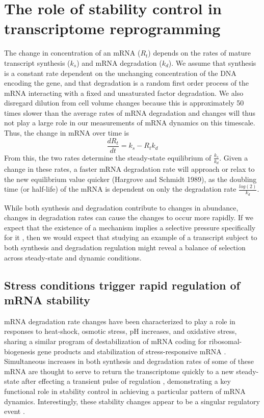 \section{The role of stability control in transcriptome
reprogramming}

The change in concentration of an mRNA ($R_t$) depends
on the rates of mature transcript synthesis ($k_s$) and mRNA
degradation ($k_d$). We assume that
synthesis is a constant rate dependent on the unchanging concentration
of the DNA encoding the gene, and that degradation is a random first
order process of the mRNA interacting with a fixed and unsaturated
factor degradation. We also disregard dilution from cell volume
changes because this is approximately 50 times slower than the average
rates of mRNA degradation and changes will thus not play a large role
in our measurements of mRNA dynamics on this timescale.  
Thus, the change in mRNA over time is $$
\frac{dR_t}{dt} = k_s - R_t k_d$$ From this, the two rates determine
the steady-state equilibrium of $\frac{k_s}{k_d}$. Given a change in
these rates, a faster mRNA degradation rate will approach or relax to
the new equilibrium value quicker (Hargrove and Schmidt 1989), as the
doubling time (or half-life) of the mRNA is dependent on only the
degradation rate $\frac{log(2)}{k_d}$.  

While both synthesis and
degradation contribute to changes in abundance, changes in degradation
rates can cause the changes to occur more rapidly. If we expect that
the existence of a mechanism implies a selective pressure specifically
for it 
\parencite{gould1979spandrels},
then we would expect that studying
an example of a transcript subject to both synthesis and degradation
regulation might reveal a balance of selection across steady-state and
dynamic conditions. 

\subsection{Stress conditions trigger rapid regulation of mRNA stability}

mRNA degradation rate changes have been characterized
to play a role in responses to heat-shock, osmotic stress, pH
increases, and oxidative stress, sharing a similar program of
destabilization of mRNA coding for ribosomal-biogenesis gene products
and stabilization of stress-responsive mRNA 
\parencite{canadell2015impact,molina2008comprehensive,shalem2011transcriptome,romero2009specific,molin2009mrna,castells2011heat,miller2011dynamic,garre2013nonsense}.
Simultaneous increases in both synthesis and
degradation rates of some of these mRNA are thought to serve to return
the transcriptome quickly to a new steady-state after effecting a
transient pulse of regulation 
\parencite{shalem2008transient,rabani2011metabolic},
demonstrating a key functional role in stability control in
achieving a particular pattern of mRNA dynamics. Interestingly, these
stability changes appear to be a singular regulatory event
\parencite{perez2013eukaryotic}. 

